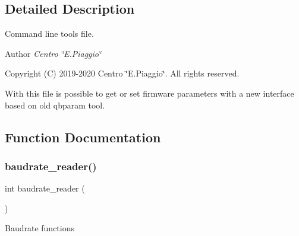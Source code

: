\subsection{Detailed Description}
Command line tools file. 

\begin{DoxyAuthor}{Author}
{\itshape Centro \char`\"{}\+E.\+Piaggio\char`\"{}} 
\end{DoxyAuthor}
\begin{DoxyCopyright}{Copyright}
(C) 2019-\/2020 Centro \char`\"{}\+E.\+Piaggio\char`\"{}. All rights reserved.
\end{DoxyCopyright}
With this file is possible to get or set firmware parameters with a new interface based on old qbparam tool. 

\subsection{Function Documentation}
\mbox{\label{nmmi__param_8c_a872d84bb02f7d8f4617246f0c6d37c43}} 
\subsubsection{baudrate\+\_\+reader()}
{\footnotesize\ttfamily int baudrate\+\_\+reader (\begin{DoxyParamCaption}{ }\end{DoxyParamCaption})}

Baudrate functions 